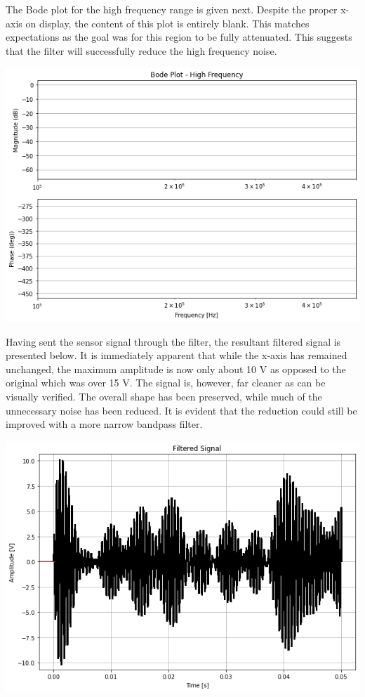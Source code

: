 \documentclass[12pt]{report}
\begin{document}
The Bode plot for the high frequency range is given next. Despite the proper x-axis on display, the content of this plot is entirely blank. This matches expectations as the goal was for this region to be fully attenuated. This suggests that the filter will successfully reduce the high frequency noise. \\

\begin{center}
	\includegraphics[scale = 0.41]{Lab 12 - Plots/Bode4.png}\\[0.5 cm]
\end{center}

Having sent the sensor signal through the filter, the resultant filtered signal is presented below. It is immediately apparent that while the x-axis has remained unchanged, the maximum amplitude is now only about 10 V as opposed to the original which was over 15 V. The signal is, however, far cleaner as can be visually verified. The overall shape has been preserved, while much of the unnecessary noise has been reduced. It is  evident that the reduction could still be improved with a more narrow bandpass filter.

\begin{center}
	\includegraphics[scale = 0.45]{Lab 12 - Plots/Filtered Signal.png}\\[1.0 cm]
\end{center}
\end{document}
